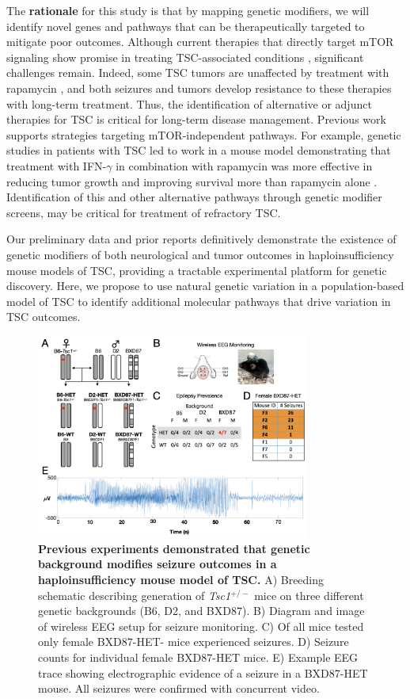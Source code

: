 \documentclass[
  12pt,
]{article}
\begin{document}
The \textbf{rationale} for this study is that by mapping genetic
modifiers, we will identify novel genes and pathways that can be
therapeutically targeted to mitigate poor outcomes. Although current
therapies that directly target mTOR signaling show promise in treating
TSC-associated conditions \cite{30760308, 29438097, 15578690, 20235887},
significant challenges remain. Indeed, some TSC tumors are unaffected by
treatment with rapamycin
\cite{15557109, 20235887, 25347447, 24395886, 22457331}, and both
seizures \cite{30305233} and tumors \cite{36028490, 22788941} develop
resistance to these therapies with long-term treatment. Thus, the
identification of alternative or adjunct therapies for TSC is critical
for long-term disease management. Previous work supports strategies
targeting mTOR-independent pathways. For example, genetic studies in
patients with TSC led to work in a mouse model demonstrating that
treatment with IFN-\(\gamma\) in combination with rapamycin was more
effective in reducing tumor growth and improving survival more than
rapamycin alone \cite{16845661}. Identification of this and other
alternative pathways \cite{15150271, 16803888, 24395886, 23715154}
through genetic modifier screens, may be critical for treatment of
refractory TSC.

Our preliminary data and prior reports definitively demonstrate the
existence of genetic modifiers of both neurological and tumor outcomes
in haploinsufficiency mouse models of TSC, providing a tractable
experimental platform for genetic discovery. Here, we propose to use
natural genetic variation in a population-based model of TSC to identify
additional molecular pathways that drive variation in TSC outcomes.

\begin{figure}[ht!]
\includegraphics[width=0.8\textwidth]{Fig2.png} 
\caption{\textbf{Previous experiments demonstrated that genetic background modifies seizure outcomes in a haploinsufficiency mouse model of TSC.} A) Breeding schematic describing generation of \textit{Tsc1}$^{+/-}$ mice on three different genetic backgrounds (B6, D2, and BXD87). B) Diagram and image of wireless EEG setup for seizure monitoring. C) Of all mice tested only female BXD87-HET- mice experienced seizures. D) Seizure counts for individual female BXD87-HET mice. E) Example EEG trace showing electrographic evidence of a seizure in a BXD87-HET mouse. All seizures were confirmed with concurrent video.
}
\label{fig:bxd}
\end{figure}
\end{document}
